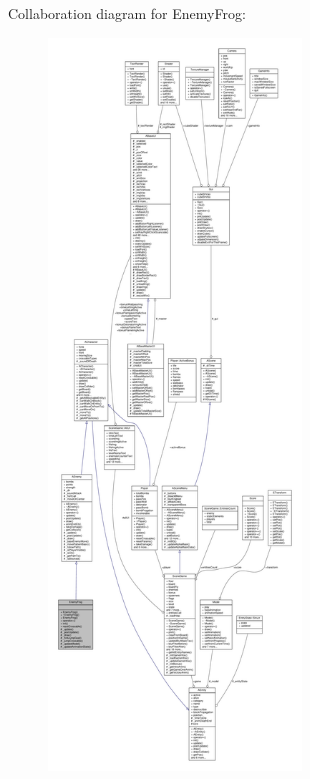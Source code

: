 Collaboration diagram for Enemy\+Frog\+:
\nopagebreak
\begin{figure}[H]
\begin{center}
\leavevmode
\includegraphics[height=550pt]{class_enemy_frog__coll__graph}
\end{center}
\end{figure}
